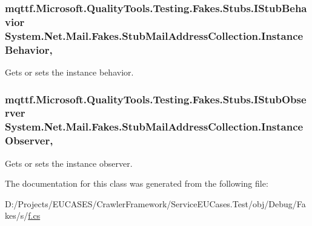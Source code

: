 \hypertarget{class_system_1_1_net_1_1_mail_1_1_fakes_1_1_stub_mail_address_collection_ac1a39bb6a2d84f2f9d1eeb3f73df9623}{
\subsubsection[{Instance\-Behavior}]{\setlength{\rightskip}{0pt plus 5cm}mqttf.\-Microsoft.\-Quality\-Tools.\-Testing.\-Fakes.\-Stubs.\-I\-Stub\-Behavior System.\-Net.\-Mail.\-Fakes.\-Stub\-Mail\-Address\-Collection.\-Instance\-Behavior\hspace{0.3cm}{\ttfamily [get]}, {\ttfamily [set]}}}\label{class_system_1_1_net_1_1_mail_1_1_fakes_1_1_stub_mail_address_collection_ac1a39bb6a2d84f2f9d1eeb3f73df9623}


Gets or sets the instance behavior.

\hypertarget{class_system_1_1_net_1_1_mail_1_1_fakes_1_1_stub_mail_address_collection_a2e86fd81bae133d673cc6e40630a497d}{
\subsubsection[{Instance\-Observer}]{\setlength{\rightskip}{0pt plus 5cm}mqttf.\-Microsoft.\-Quality\-Tools.\-Testing.\-Fakes.\-Stubs.\-I\-Stub\-Observer System.\-Net.\-Mail.\-Fakes.\-Stub\-Mail\-Address\-Collection.\-Instance\-Observer\hspace{0.3cm}{\ttfamily [get]}, {\ttfamily [set]}}}\label{class_system_1_1_net_1_1_mail_1_1_fakes_1_1_stub_mail_address_collection_a2e86fd81bae133d673cc6e40630a497d}


Gets or sets the instance observer.



The documentation for this class was generated from the following file\-:\begin{DoxyCompactItemize}
\item 
D\-:/\-Projects/\-E\-U\-C\-A\-S\-E\-S/\-Crawler\-Framework/\-Service\-E\-U\-Cases.\-Test/obj/\-Debug/\-Fakes/s/\hyperlink{s_2f_8cs}{f.\-cs}\end{DoxyCompactItemize}
